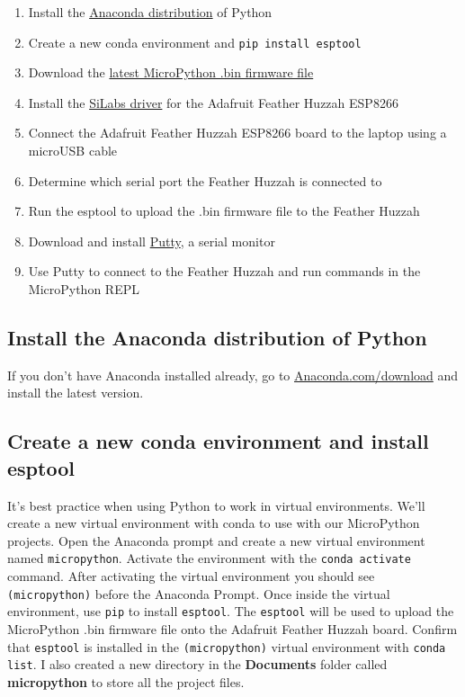 \documentclass{book}
\providecommand{\tightlist}{%
      \setlength{\itemsep}{0pt}\setlength{\parskip}{0pt}}
\begin{document}
    \begin{enumerate}
\def\labelenumi{\arabic{enumi}.}
\tightlist
\item
  Install the \href{https://www.anaconda.com/download/}{Anaconda
  distribution} of Python
\item
  Create a new conda environment and \lstinline!pip install esptool!
\item
  Download the \href{http://micropython.org/download\#esp8266}{latest
  MicroPython .bin firmware file}
\item
  Install the
  \href{https://www.silabs.com/products/development-tools/software/usb-to-uart-bridge-vcp-drivers}{SiLabs
  driver} for the Adafruit Feather Huzzah ESP8266
\item
  Connect the Adafruit Feather Huzzah ESP8266 board to the laptop using
  a microUSB cable
\item
  Determine which serial port the Feather Huzzah is connected to
\item
  Run the esptool to upload the .bin firmware file to the Feather Huzzah
\item
  Download and install \href{https://www.putty.org/}{Putty}, a serial
  monitor
\item
  Use Putty to connect to the Feather Huzzah and run commands in the
  MicroPython REPL
\end{enumerate}

    \subsection{Install the Anaconda distribution of
Python}\label{install-the-anaconda-distribution-of-python}

    If you don't have Anaconda installed already, go to
\href{https://www.anaconda.com/download/}{Anaconda.com/download} and
install the latest version.

    \subsection{\texorpdfstring{Create a new conda environment and install
\textbf{esptool}}{Create a new conda environment and install esptool}}\label{create-a-new-conda-environment-and-install-esptool}

    It's best practice when using Python to work in virtual environments.
We'll create a new virtual environment with conda to use with our
MicroPython projects. Open the Anaconda prompt and create a new virtual
environment named \lstinline!micropython!. Activate the environment with
the \lstinline!conda activate! command. After activating the virtual
environment you should see \lstinline!(micropython)! before the Anaconda
Prompt. Once inside the virtual environment, use \lstinline!pip! to
install \lstinline!esptool!. The \lstinline!esptool! will be used to
upload the MicroPython .bin firmware file onto the Adafruit Feather
Huzzah board. Confirm that \lstinline!esptool! is installed in the
\lstinline!(micropython)! virtual environment with
\lstinline!conda list!. I also created a new directory in the
\textbf{Documents} folder called \textbf{micropython} to store all the
project files.
\end{document}
